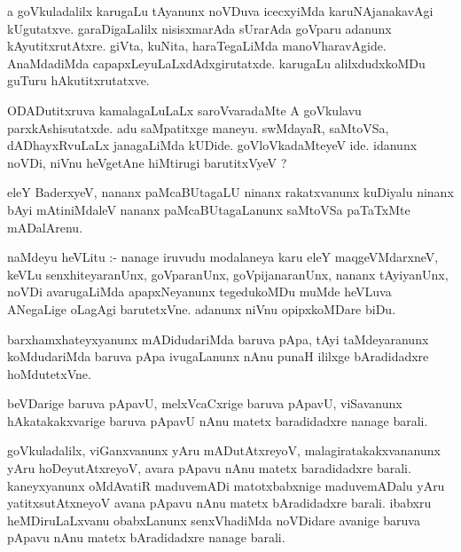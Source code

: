 \documentclass{article}
\begin{document}
\begin{mn}
a goVkuladalilx  karugaLu  tAyanunx  noVDuva  icecxyiMda  karuNAjanakavAgi kUgutatxve.  
garaDigaLalilx  nisisxmarAda  sUrarAda  goVparu  adanunx  kAyutitxrutAtxre.  giVta,  
kuNita,  haraTegaLiMda  manoVharavAgide.  AnaMdadiMda  capapxLeyuLaLxdAdxgirutatxde.  
karugaLu  alilxdudxkoMDu  guTuru  hAkutitxrutatxve.
\end{mn}

\begin{mn}
ODADutitxruva  kamalagaLuLaLx  saroVvaradaMte  A  goVkulavu  parxkAshisutatxde.  adu  
saMpatitxge  maneyu.  swMdayaR,  saMtoVSa,  dADhayxRvuLaLx  janagaLiMda  kUDide.  
goVloVkadaMteyeV  ide.  idanunx  noVDi,  niVnu  heVgetAne  hiMtirugi  barutitxVyeV ?
\end{mn}

\begin{mn}
eleY  BaderxyeV,  nananx  paMcaBUtagaLU  ninanx  rakatxvanunx  kuDiyalu  ninanx  
bAyi  mAtiniMdaleV  nananx  paMcaBUtagaLanunx  saMtoVSa paTaTxMte  mADalArenu.
\end{mn}

\begin{mn}
naMdeyu  heVLitu :- nanage  iruvudu  modalaneya  karu  eleY  maqgeVMdarxneV,  keVLu  
senxhiteyaranUnx,  goVparanUnx,  goVpijanaranUnx,  nananx tAyiyanUnx,  noVDi  
avarugaLiMda  apapxNeyanunx  tegedukoMDu  muMde  heVLuva  ANegaLige  oLagAgi  
barutetxVne.  adanunx  niVnu  opipxkoMDare  biDu.
\end{mn}

\begin{mn}
barxhamxhateyxyanunx  mADidudariMda  baruva  pApa,  tAyi taMdeyaranunx  koMdudariMda  
baruva  pApa  ivugaLanunx  nAnu  punaH  ililxge  bAradidadxre  hoMdutetxVne.
\end{mn}

\begin{mn}
beVDarige  baruva  pApavU,  melxVcaCxrige  baruva  pApavU,  viSavanunx  hAkatakakxvarige  
baruva  pApavU  nAnu  matetx  baradidadxre  nanage  barali.
\end{mn}

\begin{mn}
goVkuladalilx,  viGanxvanunx  yAru  mADutAtxreyoV,  malagiratakakxvananunx  yAru  
hoDeyutAtxreyoV,  avara  pApavu  nAnu  matetx  baradidadxre  barali.  kaneyxyanunx  
oMdAvatiR  maduvemADi  matotxbabxnige  maduvemADalu  yAru  yatitxsutAtxneyoV  avana  
pApavu  nAnu  matetx  bAradidadxre  barali.  ibabxru  heMDiruLaLxvanu  obabxLanunx  
senxVhadiMda  noVDidare  avanige  baruva  pApavu  nAnu  matetx  bAradidadxre  nanage  barali.
\end{mn}
\end{document}
